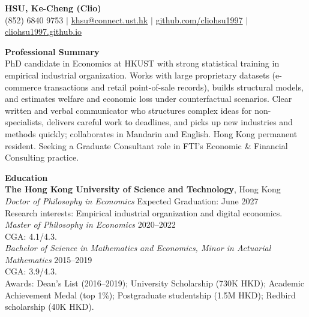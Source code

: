 \documentclass[11pt,letterpaper]{article}
\begin{document}
{\Large \textbf{HSU, Ke-Cheng (Clio)}}\\[1pt]
(852) 6840 9753 \quad $|$ \quad \href{mailto:khsu@connect.ust.hk}{khsu@connect.ust.hk} \quad $|$ \quad \href{https://github.com/cliohsu1997}{github.com/cliohsu1997} \quad $|$ \quad \href{https://cliohsu1997.github.io/}{cliohsu1997.github.io}

\vspace{0.15pt}

{\large \textbf{Professional Summary}}\\[-0.5pt]
PhD candidate in Economics at HKUST with strong statistical training in empirical industrial organization. Works with large proprietary datasets (e-commerce transactions and retail point-of-sale records), builds structural models, and estimates welfare and economic loss under counterfactual scenarios. Clear written and verbal communicator who structures complex ideas for non-specialists, delivers careful work to deadlines, and picks up new industries and methods quickly; collaborates in Mandarin and English. Hong Kong permanent resident. Seeking a Graduate Consultant role in FTI's Economic \& Financial Consulting practice.

\vspace{0.15pt}

{\large \textbf{Education}}\\[-0.5pt]
\textbf{The Hong Kong University of Science and Technology}, Hong Kong\\
\textit{Doctor of Philosophy in Economics} \hfill Expected Graduation: June 2027\\
Research interests: Empirical industrial organization and digital economics.\\
\textit{Master of Philosophy in Economics} \hfill 2020--2022\\
CGA: 4.1/4.3.\\
\textit{Bachelor of Science in Mathematics and Economics, Minor in Actuarial Mathematics} \hfill 2015--2019\\
CGA: 3.9/4.3.\\
Awards: Dean's List (2016--2019); University Scholarship (730K HKD); Academic Achievement Medal (top 1\%); Postgraduate studentship (1.5M HKD); Redbird scholarship (40K HKD).

\vspace{0.15pt}
\end{document}
